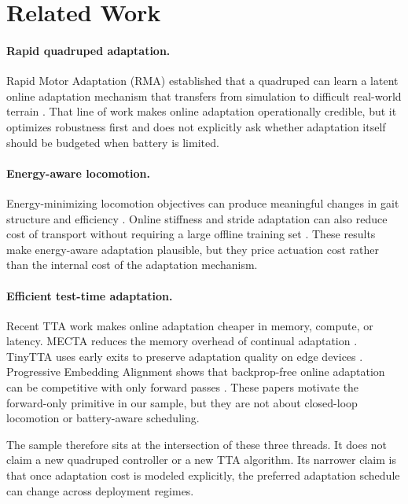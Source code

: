\section{Related Work}

\paragraph{Rapid quadruped adaptation.}
Rapid Motor Adaptation (RMA) established that a quadruped can learn a latent online adaptation mechanism that transfers from simulation to difficult real-world terrain \citep{kumar2021rma}. That line of work makes online adaptation operationally credible, but it optimizes robustness first and does not explicitly ask whether adaptation itself should be budgeted when battery is limited.

\paragraph{Energy-aware locomotion.}
Energy-minimizing locomotion objectives can produce meaningful changes in gait structure and efficiency \citep{fu2021gaits}. Online stiffness and stride adaptation can also reduce cost of transport without requiring a large offline training set \citep{aboufazeli2023online}. These results make energy-aware adaptation plausible, but they price actuation cost rather than the internal cost of the adaptation mechanism.

\paragraph{Efficient test-time adaptation.}
Recent TTA work makes online adaptation cheaper in memory, compute, or latency. MECTA reduces the memory overhead of continual adaptation \citep{hong2023mecta}. TinyTTA uses early exits to preserve adaptation quality on edge devices \citep{jia2024tinytta}. Progressive Embedding Alignment shows that backprop-free online adaptation can be competitive with only forward passes \citep{xiao2026architecture}. These papers motivate the forward-only primitive in our sample, but they are not about closed-loop locomotion or battery-aware scheduling.

The sample therefore sits at the intersection of these three threads. It does not claim a new quadruped controller or a new TTA algorithm. Its narrower claim is that once adaptation cost is modeled explicitly, the preferred adaptation schedule can change across deployment regimes.
